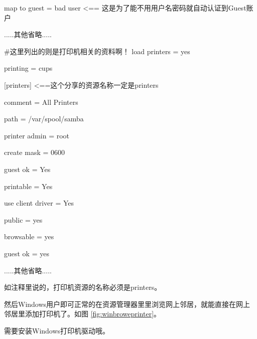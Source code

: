 \begin{code}
[global]

		map to guest = bad user <== 这是为了能不用用户名密码就自动认证到Guest账户

		.....其他省略.....
		
		\#这里列出的则是打印机相关的资料啊！
		load printers = yes
		
		printing = cups

[printers] <==这个分享的资源名称一定是printers

		comment = All Printers
		
		path = /var/spool/samba
		
		printer admin = root
		
		create mask = 0600
		
		guest ok = Yes
		
		printable = Yes
		
		use client driver = Yes
		
		public = yes
		
		browsable = yes
		
		guest ok = yes
		
		.....其他省略..... 
         
\end{code}

如注释里说的，打印机资源的名称必须是printers。


然后Windows用户即可正常的在资源管理器里里浏览网上邻居，就能直接在网上邻居里添加打印机了。如图 \ref{fig:winbroweprinter}。


需要安装Windows打印机驱动哦。
